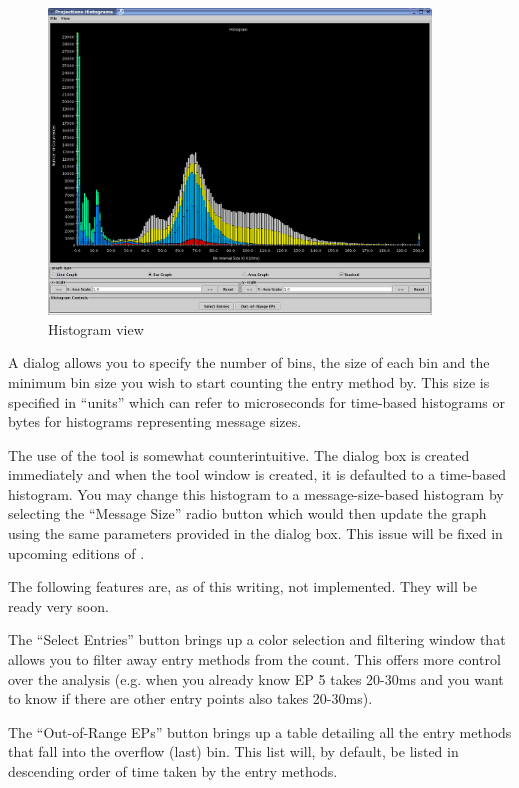 \documentclass[10pt]{article}
\begin{document}
\begin{figure}[htb]
\center
\includegraphics[width=4.0in]{fig/histogram}
\caption{Histogram view}
\label{histogram}
\end{figure}

A dialog allows you to specify the number of bins, the size of each
bin and the minimum bin size you wish to start counting the entry
method by. This size is specified in ``units'' which can refer to
microseconds for time-based histograms or bytes for histograms
representing message sizes.

The use of the tool is somewhat counterintuitive. The dialog box is
created immediately and when the tool window is created, it is
defaulted to a time-based histogram. You may change this histogram to
a message-size-based histogram by selecting the ``Message Size'' radio
button which would then update the graph using the same parameters
provided in the dialog box. This issue will be fixed in upcoming
editions of \projections{}.

The following features are, as of this writing, not implemented. They
will be ready very soon.

The ``Select Entries'' button brings up a color selection and
filtering window that allows you to filter away entry methods from the
count. This offers more control over the analysis (e.g. when you
already know EP 5 takes 20-30ms and you want to know if there
are other entry points also takes 20-30ms).

The ``Out-of-Range EPs'' button brings up a table detailing all the
entry methods that fall into the overflow (last) bin. This list will,
by default, be listed in descending order of time taken by the entry
methods.
\end{document}
